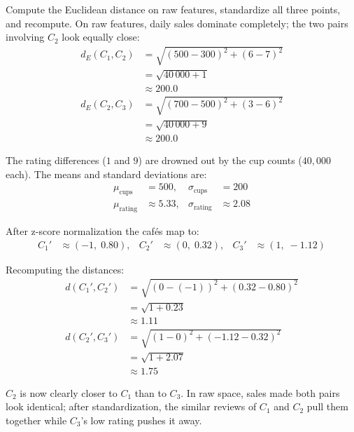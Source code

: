 Compute the Euclidean distance on raw features, standardize all three points, and recompute. On raw features, daily sales dominate completely; the two pairs involving $C_2$ look equally close:
\begin{align*}
    d_E(C_1, C_2) &= \sqrt{(500{-}300)^2 + (6{-}7)^2} \\
    &= \sqrt{40\,000 + 1} \\
    &\approx 200.0 \\
    d_E(C_2, C_3) &= \sqrt{(700{-}500)^2 + (3{-}6)^2} \\
    &= \sqrt{40\,000 + 9} \\
    &\approx 200.0
\end{align*}

The rating differences ($1$ and $9$) are drowned out by the cup counts ($40{,}000$ each). The means and standard deviations are:
\begin{align*}
    \mu_{\text{cups}} &= 500, & \sigma_{\text{cups}} &= 200 \\
    \mu_{\text{rating}} &\approx 5.33,   & \sigma_{\text{rating}} &\approx 2.08
\end{align*}

After z-score normalization the cafés map to:
\begin{align*}
    C_1' &\approx (-1,\;0.80), & C_2' &\approx (0,\;0.32), & C_3' &\approx (1,\;{-}1.12)
\end{align*}

Recomputing the distances:
\begin{align*}
    d(C_1', C_2') &= \sqrt{(0{-}({-}1))^2 + (0.32{-}0.80)^2} \\
                  &= \sqrt{1 + 0.23} \\
                  &\approx 1.11 \\
    d(C_2', C_3') &= \sqrt{(1{-}0)^2 + ({-}1.12{-}0.32)^2} \\
                  &= \sqrt{1 + 2.07} \\
                  &\approx 1.75
\end{align*}

$C_2$ is now clearly closer to $C_1$ than to $C_3$. In raw space, sales made both pairs look identical; after standardization, the similar reviews of $C_1$ and $C_2$ pull them together while $C_3$'s low rating pushes it away.








